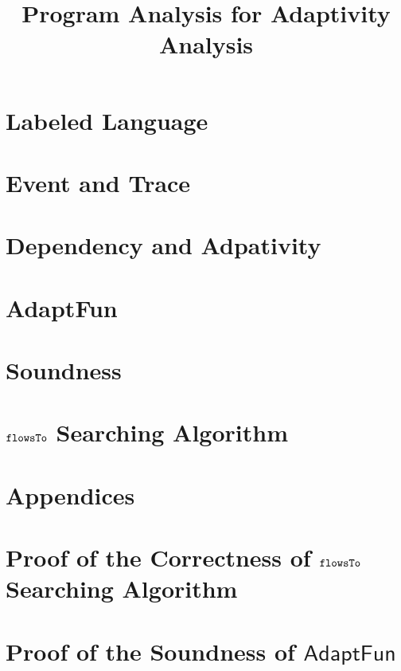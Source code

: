 \documentclass[a4paper,11pt]{article}
\newcommand{\THESYSTEM}{\textsf{AdaptFun}}
\begin{document}
\title{Program Analysis for Adaptivity Analysis}

\author{}

\date{}

\maketitle
%
% 
\section{Labeled Language}

\clearpage
\section{Event and Trace}


\clearpage
\section{Dependency and Adpativity}


% 
\clearpage
\section{\THESYSTEM}
\label{sec:adpfun}





\clearpage
\section{Soundness}

\clearpage
%
\clearpage
\section{$\mathtt{flowsTo}$ Searching Algorithm}

\appendix
{}
\section*{Appendices}
\section{Proof of the Correctness of $\mathtt{flowsTo}$ Searching Algorithm}

\section{Proof of the Soundness of $\THESYSTEM$}
% 



\end{document}
